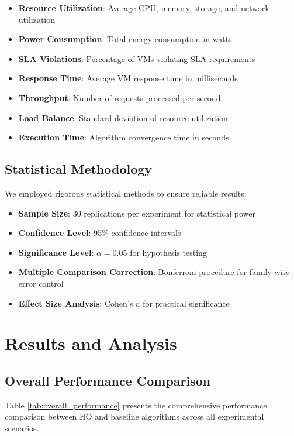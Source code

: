 \documentclass[conference]{IEEEtran}
\begin{document}
\begin{itemize}
    \item \textbf{Resource Utilization}: Average CPU, memory, storage, and network utilization
    \item \textbf{Power Consumption}: Total energy consumption in watts
    \item \textbf{SLA Violations}: Percentage of VMs violating SLA requirements
    \item \textbf{Response Time}: Average VM response time in milliseconds
    \item \textbf{Throughput}: Number of requests processed per second
    \item \textbf{Load Balance}: Standard deviation of resource utilization
    \item \textbf{Execution Time}: Algorithm convergence time in seconds
\end{itemize}

\subsection{Statistical Methodology}

We employed rigorous statistical methods to ensure reliable results:

\begin{itemize}
    \item \textbf{Sample Size}: 30 replications per experiment for statistical power
    \item \textbf{Confidence Level}: 95\% confidence intervals
    \item \textbf{Significance Level}: $\alpha = 0.05$ for hypothesis testing
    \item \textbf{Multiple Comparison Correction}: Bonferroni procedure for family-wise error control
    \item \textbf{Effect Size Analysis}: Cohen's d for practical significance
\end{itemize}

\section{Results and Analysis}

\subsection{Overall Performance Comparison}

Table \ref{tab:overall_performance} presents the comprehensive performance comparison between HO and baseline algorithms across all experimental scenarios.
\end{document}
